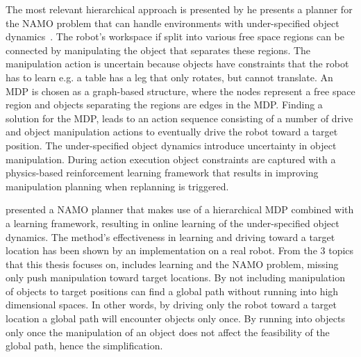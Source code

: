 The most relevant hierarchical approach is presented by \citeauthor{scholz_navigation_2016} he presents a planner for the \ac{NAMO} problem that can handle environments with under-specified object dynamics~\cite{scholz_navigation_2016}. The robot's workspace if split into various free space regions can be connected by manipulating the object that separates these regions. The manipulation action is uncertain because objects have constraints that the robot has to learn e.g. a table has a leg that only rotates, but cannot translate. An \ac{MDP} is chosen as a graph-based structure, where the nodes represent a free space region and objects separating the regions are edges in the \ac{MDP}. Finding a solution for the \ac{MDP}, leads to an action sequence consisting of a number of drive and object manipulation actions to eventually drive the robot toward a target position. The under-specified object dynamics introduce uncertainty in object manipulation. During action execution object constraints are captured with a physics-based reinforcement learning framework that results in improving manipulation planning when replanning is triggered.\bs

\citeauthor{scholz_navigation_2016} presented a \ac{NAMO} planner that makes use of a hierarchical \ac{MDP} combined with a learning framework, resulting in online learning of the under-specified object dynamics. The method's effectiveness in learning and driving toward a target location has been shown by an implementation on a real robot. From the 3 topics that this thesis focuses on, \citeauthor{scholz_navigation_2016} includes learning and the \ac{NAMO} problem, missing only push manipulation toward target locations. By not including manipulation of objects to target positions \citeauthor{scholz_navigation_2016} can find a global path without running into high dimensional spaces. In other words, by driving only the robot toward a target location a global path will encounter objects only once. By running into objects only once the manipulation of an object does not affect the feasibility of the global path, hence the simplification.\bs


